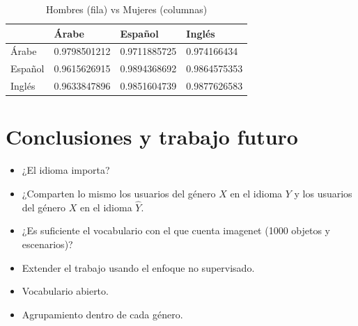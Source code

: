 \documentclass[runningheads]{llncs}
\begin{document}
\begin{table}[]
\centering
\caption{Hombres (fila) vs Mujeres (columnas)}
\label{male-female-correlation}
\begin{tabular}{|l|l|l|l|}
\hline
        & Árabe        & Español      & Inglés       \\ \hline
Árabe   & 0.9798501212 & 0.9711885725 & 0.974166434  \\ \hline
Español & 0.9615626915 & 0.9894368692 & 0.9864575353 \\ \hline
Inglés  & 0.9633847896 & 0.9851604739 & 0.9877626583 \\ \hline
\end{tabular}
\end{table}




\section{Conclusiones y trabajo futuro}

\begin{itemize}
    \item ¿El idioma importa? 
    \item ¿Comparten lo mismo los usuarios del género $X$ en el idioma
    $Y$ y los usuarios del género $X$ en el idioma $\hat{Y}$.
    \item ¿Es suficiente el vocabulario con el que cuenta imagenet
    (1000 objetos y escenarios)?
    \item Extender el trabajo usando el enfoque no supervisado.
    \item Vocabulario abierto.
    \item Agrupamiento dentro de cada género.
\end{itemize}



\end{document}
